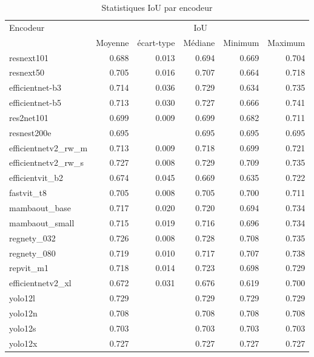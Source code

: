 \begin{table}[H]
    \centering
    \begin{tabular}{lrrrrr}
    \toprule
    Encodeur & \multicolumn{5}{c}{IoU} \\
    & Moyenne & écart-type & Médiane & Minimum & Maximum \\
    \midrule
    resnext101 & 0.688 & 0.013 & 0.694 & 0.669 & 0.704 \\
    resnext50 & 0.705 & 0.016 & 0.707 & 0.664 & 0.718 \\
    efficientnet-b3 & 0.714 & 0.036 & 0.729 & 0.634 & 0.735 \\
    efficientnet-b5 & 0.713 & 0.030 & 0.727 & 0.666 & 0.741 \\
    res2net101 & 0.699 & 0.009 & 0.699 & 0.682 & 0.711 \\
    resnest200e & 0.695 &  & 0.695 & 0.695 & 0.695 \\
    efficientnetv2\_rw\_m & 0.713 & 0.009 & 0.718 & 0.699 & 0.721 \\
    efficientnetv2\_rw\_s & 0.727 & 0.008 & 0.729 & 0.709 & 0.735 \\
    efficientvit\_b2 & 0.674 & 0.045 & 0.669 & 0.635 & 0.722 \\
    fastvit\_t8 & 0.705 & 0.008 & 0.705 & 0.700 & 0.711 \\
    mambaout\_base & 0.717 & 0.020 & 0.720 & 0.694 & 0.734 \\
    mambaout\_small & 0.715 & 0.019 & 0.716 & 0.696 & 0.734 \\
    regnety\_032 & 0.726 & 0.008 & 0.728 & 0.708 & 0.735 \\
    regnety\_080 & 0.719 & 0.010 & 0.717 & 0.707 & 0.738 \\
    repvit\_m1 & 0.718 & 0.014 & 0.723 & 0.698 & 0.729 \\
    efficientnetv2\_xl & 0.672 & 0.031 & 0.676 & 0.619 & 0.700 \\
    yolo12l & 0.729 &  & 0.729 & 0.729 & 0.729 \\
    yolo12n & 0.708 &  & 0.708 & 0.708 & 0.708 \\
    yolo12s & 0.703 &  & 0.703 & 0.703 & 0.703 \\
    yolo12x & 0.727 &  & 0.727 & 0.727 & 0.727 \\
    \bottomrule
    \end{tabular}
    \caption{Statistiques IoU par encodeur}
    \label{tab:statistique_par_encodeur_iou}
\end{table}

